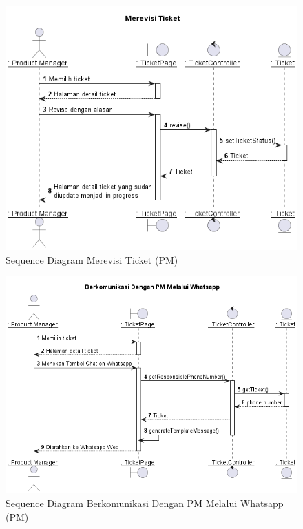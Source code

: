 \documentclass[12pt]{article}
\begin{document}
\begin{enumerate}[label=\textbf{4.\arabic*.}]
\begin{enumerate}[label=\textbf{4.1.\arabic*.}, wide, labelwidth=!, labelindent=0pt]
\begin{enumerate}[label=\textbf{4.1.7.\arabic*.}, wide, labelwidth=!, labelindent=0pt]
\begin{enumerate}[label=\arabic*.]
                \begin{figure}
                    \centering \includegraphics[height=0.575\textheight]{out/plantuml/sequence/ipm/ipm6/Merevisi Ticket.png}
                    \caption{Sequence Diagram Merevisi Ticket (PM)}
                    \label{fig:SQ-PM-06}
                \end{figure}

                \begin{figure}
                    \centering \includegraphics[height=0.575\textheight]{out/plantuml/sequence/ipm/ipm7/Berkomunikasi Dengan PM Melalui Whatsapp.png}
                    \caption{Sequence Diagram Berkomunikasi Dengan PM Melalui Whatsapp (PM)}
                    \label{fig:SQ-PM-07}
                \end{figure}


\end{enumerate}
\end{enumerate}
\end{enumerate}
\end{enumerate}
\end{document}
